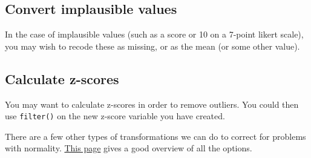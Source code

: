 \documentclass[]{book}
\newenvironment{Shaded}{\begin{snugshade}}{\end{snugshade}}
\newcommand{\CommentTok}[1]{\textcolor[rgb]{0.56,0.35,0.01}{\textit{#1}}}
\newcommand{\DataTypeTok}[1]{\textcolor[rgb]{0.13,0.29,0.53}{#1}}
\newcommand{\DecValTok}[1]{\textcolor[rgb]{0.00,0.00,0.81}{#1}}
\newcommand{\KeywordTok}[1]{\textcolor[rgb]{0.13,0.29,0.53}{\textbf{#1}}}
\newcommand{\NormalTok}[1]{#1}
\newcommand{\OperatorTok}[1]{\textcolor[rgb]{0.81,0.36,0.00}{\textbf{#1}}}
\newcommand{\OtherTok}[1]{\textcolor[rgb]{0.56,0.35,0.01}{#1}}
\newcommand{\StringTok}[1]{\textcolor[rgb]{0.31,0.60,0.02}{#1}}
\begin{document}
\hypertarget{convert-implausible-values}{%
\subsection{Convert implausible values}\label{convert-implausible-values}}

In the case of implausible values (such as a score or 10 on a 7-point likert scale), you may wish to recode these as missing, or as the mean (or some other value).

\begin{Shaded}
\end{Shaded}

\hypertarget{calculate-z-scores}{%
\subsection{Calculate z-scores}\label{calculate-z-scores}}

You may want to calculate z-scores in order to remove outliers. You could then use \texttt{filter()} on the new z-score variable you have created.

\begin{Shaded}
\end{Shaded}

There are a few other types of transformations we can do to correct for problems with normality. \href{https://rcompanion.org/handbook/I_12.html}{This page} gives a good overview of all the options.
\end{document}
